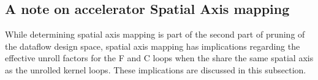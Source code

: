 


\subsection{A note on accelerator Spatial Axis mapping}
\label{chap:dda:dataflow_dse:GEMM_mode:axis_mapping}

While determining spatial axis mapping is part of the second part of pruning of the
dataflow design space, spatial axis mapping has implications regarding the
effective unroll factors for the F and C loops when the share the same spatial
axis as the unrolled kernel loops. These implications are discussed in this
subsection. 

